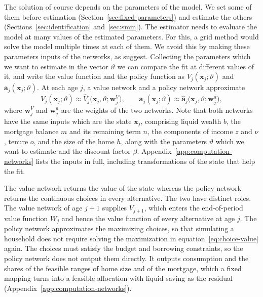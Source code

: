The solution of course depends on the parameters of the model. We set some of
them before estimation (Section~\ref{sec:fixed-parameters}) and estimate
the others (Sections~\ref{sec:identification} and~\ref{sec:smm}). The
estimator needs to evaluate the model at many values of the estimated parameters. For this, a grid method would solve the model multiple times at each of them. We avoid
this by making these parameters inputs of the networks, as
\citet{druedahl2026nonconvex} suggest. Collecting  the parameters which we want to estimate in the vector
$\vartheta$ we
can compare the fit at different values of it, and write
the value function and the policy function as
$V_j(\mathbf x_j;\vartheta)$ and $\mathbf a_j(\mathbf x_j;\vartheta)$.
At each age $j$, a value network and a policy network approximate
\begin{equation}
  V_j(\mathbf x_j;\vartheta)\approx
  \widehat V_j\bigl(\mathbf x_j,\vartheta;\mathbf w^V_j\bigr),
  \qquad
  \mathbf a_j(\mathbf x_j;\vartheta)\approx
  \widehat{\mathbf a}_j\bigl(\mathbf x_j,\vartheta;\mathbf w^a_j\bigr),
  \label{eq:networks}
\end{equation}
where $\mathbf w^V_j$ and $\mathbf w^a_j$ are the weights of the two
networks. Note that both networks have the same inputs which are the state $\mathbf x_j$,
comprising liquid wealth $b$, the mortgage balance $m$ and its remaining
term $n$, the components of income $z$ and $\nu$, tenure $o$, and the size
of the home $h$, along with the parameters $\vartheta$ which we want to estimate and the discount factor $\beta$.
Appendix~\ref{app:computation-networks} lists the inputs in full,
including transformations of the state that help the fit. 

The
value network returns the value of the state whereas the policy network
returns the continuous choices in every alternative. The two have distinct
roles. The value network of age $j+1$ supplies $V_{j+1}$, which enters the
end-of-period value function $W_j$ and hence the value function of every alternative at age
$j$. The policy network approximates the maximizing choices, so that simulating a
household does not require solving the maximization in
equation~\eqref{eq:choice-value} again. The choices must satisfy the budget and borrowing constraints, so the
policy network does not output them directly. It outputs consumption and
the shares of the feasible ranges of home size and of the mortgage, which a
fixed mapping turns into a feasible allocation with liquid saving as the
residual (Appendix~\ref{app:computation-networks}).





